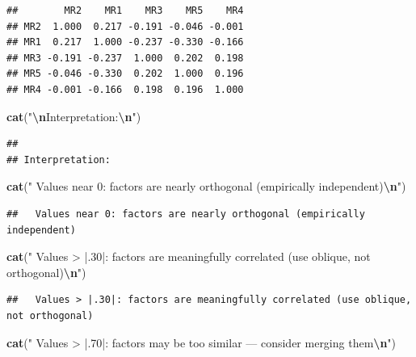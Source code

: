 \documentclass[
]{article}
\newenvironment{Shaded}{\begin{snugshade}}{\end{snugshade}}
\newcommand{\FunctionTok}[1]{\textcolor[rgb]{0.13,0.29,0.53}{\textbf{#1}}}
\newcommand{\NormalTok}[1]{#1}
\newcommand{\SpecialCharTok}[1]{\textcolor[rgb]{0.81,0.36,0.00}{\textbf{#1}}}
\newcommand{\StringTok}[1]{\textcolor[rgb]{0.31,0.60,0.02}{#1}}
\begin{document}
\begin{verbatim}
##        MR2    MR1    MR3    MR5    MR4
## MR2  1.000  0.217 -0.191 -0.046 -0.001
## MR1  0.217  1.000 -0.237 -0.330 -0.166
## MR3 -0.191 -0.237  1.000  0.202  0.198
## MR5 -0.046 -0.330  0.202  1.000  0.196
## MR4 -0.001 -0.166  0.198  0.196  1.000
\end{verbatim}

\begin{Shaded}
\begin{Highlighting}[]
\FunctionTok{cat}\NormalTok{(}\StringTok{"}\SpecialCharTok{\textbackslash{}n}\StringTok{Interpretation:}\SpecialCharTok{\textbackslash{}n}\StringTok{"}\NormalTok{)}
\end{Highlighting}
\end{Shaded}

\begin{verbatim}
## 
## Interpretation:
\end{verbatim}

\begin{Shaded}
\begin{Highlighting}[]
\FunctionTok{cat}\NormalTok{(}\StringTok{"  Values near 0: factors are nearly orthogonal (empirically independent)}\SpecialCharTok{\textbackslash{}n}\StringTok{"}\NormalTok{)}
\end{Highlighting}
\end{Shaded}

\begin{verbatim}
##   Values near 0: factors are nearly orthogonal (empirically independent)
\end{verbatim}

\begin{Shaded}
\begin{Highlighting}[]
\FunctionTok{cat}\NormalTok{(}\StringTok{"  Values \textgreater{} |.30|: factors are meaningfully correlated (use oblique, not orthogonal)}\SpecialCharTok{\textbackslash{}n}\StringTok{"}\NormalTok{)}
\end{Highlighting}
\end{Shaded}

\begin{verbatim}
##   Values > |.30|: factors are meaningfully correlated (use oblique, not orthogonal)
\end{verbatim}

\begin{Shaded}
\begin{Highlighting}[]
\FunctionTok{cat}\NormalTok{(}\StringTok{"  Values \textgreater{} |.70|: factors may be too similar — consider merging them}\SpecialCharTok{\textbackslash{}n}\StringTok{"}\NormalTok{)}
\end{Highlighting}
\end{Shaded}
\end{document}

